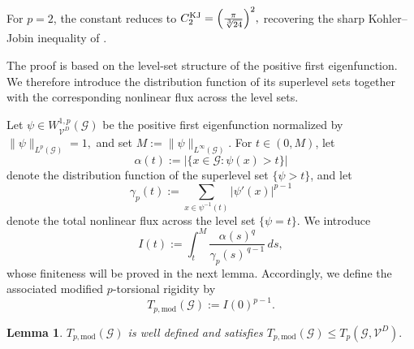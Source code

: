 \documentclass[12pt,a4paper]{article}
\numberwithin{equation}{section}
\newtheorem{lemma}[theorem]{Lemma}
\newcommand{\WpD}{W^{1,p}_{\mathcal{V}^D}(\mathcal G)}
\begin{document}
	For $p=2$, the constant reduces to
	\(
	C_2^{\mathrm{KJ}}
	=
	\Bigl(\frac{\pi}{\sqrt[3]{24}}\Bigr)^2,
	\)
	recovering the sharp Kohler--Jobin inequality of
	\cite[Theorem~5.8]{MuPl}.
	
	The proof is based on the level-set structure of the positive first
	eigenfunction. We therefore introduce the distribution function of its
	superlevel sets together with the corresponding nonlinear flux across the
	level sets.
	
	Let $\psi\in\WpD$ be the positive first eigenfunction normalized by
	\(
	\|\psi\|_{L^p(\mathcal G)}=1,
	\)
	and set
	\(
	M:=\|\psi\|_{L^\infty(\mathcal G)}.
	\)
	For $t\in(0,M)$, let
	\[
	\alpha(t)
	:=
	|\{x\in\mathcal G:\psi(x)>t\}|
	\]
	denote the distribution function of the superlevel set
	$\{\psi>t\}$, and let
	\[
	\gamma_p(t)
	:=
	\sum_{x\in\psi^{-1}(t)}
	|\psi'(x)|^{p-1}
	\]
	denote the total nonlinear flux across the level set
	$\{\psi=t\}$.
	We introduce
	\[
	I(t)
	:=
	\int_t^M
	\frac{\alpha(s)^q}{\gamma_p(s)^{\,q-1}}
	\,ds,
	\]
	whose finiteness will be proved in the next lemma.
	Accordingly, we define the associated modified $p$-torsional rigidity by
	\[
	T_{p,\mathrm{mod}}(\mathcal{G})
	:=
	I(0)^{p-1}.
	\]
	\begin{lemma}
		\label{lem:modtorsion}
 $T_{p,\mathrm{mod}}(\mathcal{G})$ is well defined and satisfies
		\(
		T_{p,\mathrm{mod}}(\mathcal{G})
		\le
		T_p(\mathcal G,\mathcal V^D).
		\)
	\end{lemma}
\end{document}
